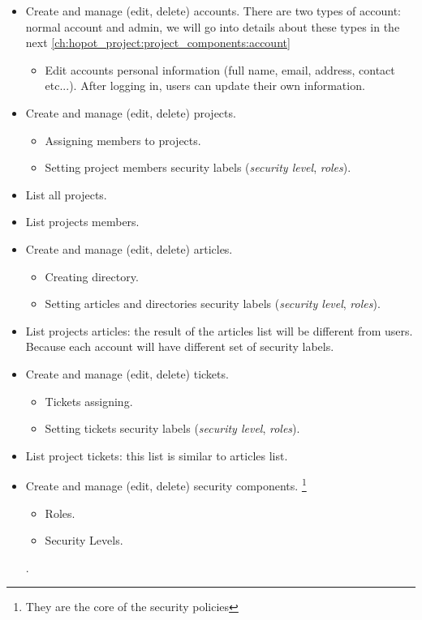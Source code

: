 \begin{itemize}
\item Create and manage (edit, delete) accounts. There are two types of account: normal account and admin, we will go into details about these types in the next \autoref{ch:hopot_project:project_components:account}
\begin{itemize} 
\item Edit accounts personal information (\eg full name, email, address, contact etc...). 
After logging in, users can update their own information.
\end{itemize}

\item Create and manage (edit, delete) projects.
\begin{itemize} 
\item Assigning members to projects. 
\item Setting project members security labels (\eg \emph{security level}, \emph{roles}).
\end{itemize}
\item List all projects.
\item List projects members.

\item Create and manage (edit, delete) articles.
\begin{itemize} 
\item Creating directory.
\item Setting articles and directories security labels (\eg \emph{security level}, \emph{roles}).
\end{itemize}
\item List projects articles: the result of the articles list will be different from users. Because each account will have different set of security labels.

\item Create and manage (edit, delete) tickets.
\begin{itemize} 
\item Tickets assigning.
\item Setting tickets security labels (\eg \emph{security level}, \emph{roles}).
\end{itemize}
\item List project tickets: this list is similar to articles list.

\item Create and manage (edit, delete) security components. \footnote{They are the core of the security policies}
\begin{itemize} 
\item Roles.
\item Security Levels.
\end{itemize}.

\end{itemize}

